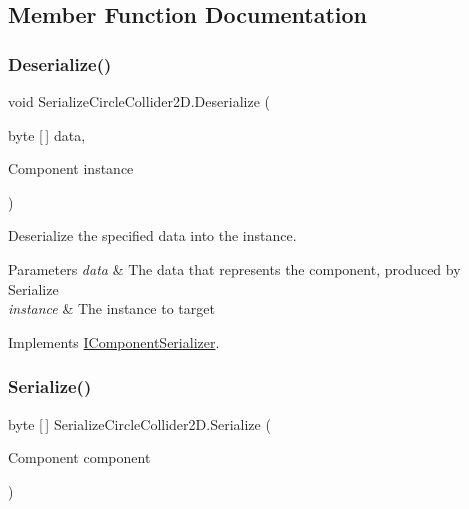 \subsection{Member Function Documentation}
\mbox{\label{class_serialize_circle_collider2_d_ae96fe731156dd3dad5f854f9fcb7ac19}} 
\subsubsection{\texorpdfstring{Deserialize()}{Deserialize()}}
{\footnotesize\ttfamily void Serialize\+Circle\+Collider2\+D.\+Deserialize (\begin{DoxyParamCaption}\item[{byte \mbox{[}$\,$\mbox{]}}]{data,  }\item[{Component}]{instance }\end{DoxyParamCaption})\hspace{0.3cm}{\ttfamily [inline]}}



Deserialize the specified data into the instance. 


\begin{DoxyParams}{Parameters}
{\em data} & The data that represents the component, produced by Serialize \\
\hline
{\em instance} & The instance to target \\
\hline
\end{DoxyParams}


Implements \hyperlink{interface_i_component_serializer_a4cc366a5c78b33d47a90c209d8fed883}{I\+Component\+Serializer}.

\mbox{\label{class_serialize_circle_collider2_d_afc9c9861ba6c6c9949d56c851dd095fa}} 
\subsubsection{\texorpdfstring{Serialize()}{Serialize()}}
{\footnotesize\ttfamily byte \mbox{[}$\,$\mbox{]} Serialize\+Circle\+Collider2\+D.\+Serialize (\begin{DoxyParamCaption}\item[{Component}]{component }\end{DoxyParamCaption})\hspace{0.3cm}{\ttfamily [inline]}}



